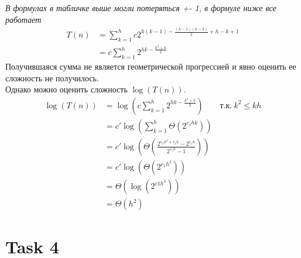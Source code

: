 \documentclass[12pt]{exam}
\begin{document}
\textit{В формулах в табличке выше могли потеряться +- 1, в формуле ниже все работает}\\
\begin{align*}
    T(n) &= \sum_{k = 1}^h c 2 ^ {h(k - 1) - \frac{(k - 1)(k - 2)}{2} + h - k + 1}  \\
         &= c \sum_{k = 1}^h 2 ^ {hk - \frac{k^2 + k}{2}}
\end{align*}
Получившаяся сумма не является геометрической прогрессией и явно оценить ее сложность не получилось. \\
Однако можно оценить сложность $\log (T(n))$. \\
\begin{align*}
\log (T(n)) &= \log (c \sum_{k = 1}^h 2 ^ {hk - \frac{k^2 + k}{2}}) \qquad \textit{т.к.} \: k^2 \leq kh \\
            &= c' \log \left( \sum_{k = 1}^h \Theta(2 ^ {c_1 h k}) \right) \\
            &= c' \log \left( \Theta \left( \frac{2^{c_1 h^2 + c_1h} - 2^{c_1h}}{2^{c_1h} - 1} \right) \right) \\
            &= c' \log \left( \Theta \left( 2^{c_1 h^2} \right)\right) \\
            &= \Theta \left( \log( 2^{c1 h^2} ) \right) \\
            &= \Theta (h^2)
\end{align*}

\section*{Task 4}
\end{document}
